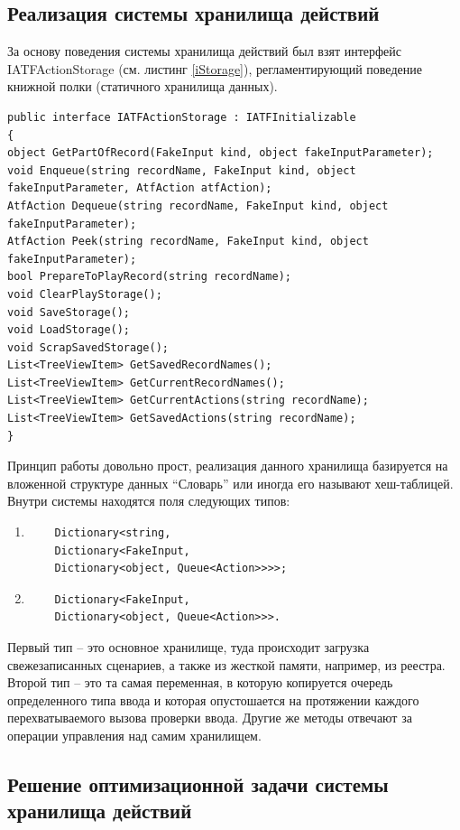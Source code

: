 \subsection{Реализация системы хранилища действий}
За основу поведения системы хранилища действий был взят интерфейс IATFActionStorage (см. листинг \ref{iStorage}), регламентирующий поведение книжной полки (статичного хранилища данных).

\begin{lstlisting}[caption={Интерфейс модуля хранилища записей},label=iStorage]
public interface IATFActionStorage : IATFInitializable
{
object GetPartOfRecord(FakeInput kind, object fakeInputParameter);
void Enqueue(string recordName, FakeInput kind, object fakeInputParameter, AtfAction atfAction);
AtfAction Dequeue(string recordName, FakeInput kind, object fakeInputParameter);
AtfAction Peek(string recordName, FakeInput kind, object fakeInputParameter);
bool PrepareToPlayRecord(string recordName);
void ClearPlayStorage();
void SaveStorage();
void LoadStorage();
void ScrapSavedStorage();
List<TreeViewItem> GetSavedRecordNames();
List<TreeViewItem> GetCurrentRecordNames();
List<TreeViewItem> GetCurrentActions(string recordName);
List<TreeViewItem> GetSavedActions(string recordName);
}
\end{lstlisting}
Принцип работы довольно прост, реализация данного хранилища базируется на вложенной структуре данных ``Словарь'' или иногда его называют хеш-таблицей. Внутри системы находятся поля следующих типов:
\begin{enumerate}
	\item 
	\begin{verbatim}
	Dictionary<string, 
	Dictionary<FakeInput, 
	Dictionary<object, Queue<Action>>>>;
	\end{verbatim}
	\item 
	\begin{verbatim}
	Dictionary<FakeInput, 
	Dictionary<object, Queue<Action>>>.
	\end{verbatim}
\end{enumerate}

Первый тип -- это основное хранилище, туда происходит загрузка свежезаписанных сценариев, а также из жесткой памяти, например, из реестра. Второй тип -- это та самая переменная, в которую копируется очередь определенного типа ввода и которая опустошается на протяжении каждого перехватываемого вызова проверки ввода. Другие же методы отвечают за операции управления над самим хранилищем.

\subsection{Решение оптимизационной задачи системы хранилища действий}

